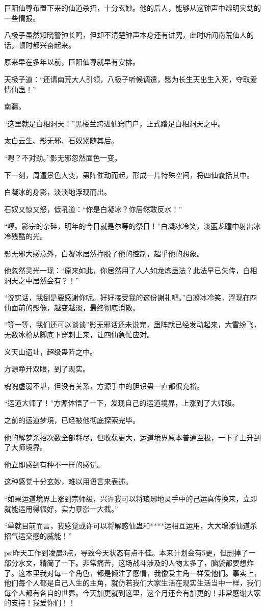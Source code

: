 \begin{this_body}
巨阳仙尊布置下来的仙道杀招，十分玄妙。他的后人，能够从这钟声中辨明灾劫的一些情报。

八极子虽然知晓警钟长鸣，但却不清楚钟声本身还有讲究，此时听闻南荒仙人的话，顿时都兴奋起来。

原来早在多年以前，巨阳仙尊就早有安排。

天极子道：“还请南荒大人引领，八极子听候调遣，愿为长生天出生入死，夺取爱情仙蛊！”

南疆。

“这里就是白相洞天！”黑楼兰跨进仙窍门户，正式踏足白相洞天之中。

太白云生、影无邪、石奴紧随其后。

“嗯？不对劲。”影无邪忽然面色一变。

下一刻，周遭景色大变，蛊阵催动而起，形成一片特殊空间，将四仙囊括其中。

白凝冰的身影，淡淡地浮现而出。

石奴又惊又怒，低吼道：“你是白凝冰？你居然敢反水！”

“哼。影宗的杂碎，明年的今日就是尔等的祭日！”白凝冰冷笑，淡蓝龙瞳中射出冰冷残酷的光。

影无邪大感意外，白凝冰居然挣脱了他的控制，超乎他的想象。

他忽然灵光一现：“原来如此，你居然用了人人如龙炼蛊法？此法早已失传，白相洞天之中居然会有？！”

“说实话，我倒是要感谢你呢。好好接受我的这份谢礼吧。”白凝冰冷笑，浮现在四仙面前的影像，越变越淡，最终彻底消散。

“等一等，我们还可以谈谈”影无邪话还未说完，蛊阵就已经发动起来，大雪纷飞，无数冰枪从脚底下穿刺上来，让四仙急忙应对。

义天山遗址，超级蛊阵之中。

方源睁开双眼，到了现实。

魂魄虚弱不堪，但没有关系，方源手中的胆识蛊一直都很充裕。

“运道大师了！”方源体悟了一下，发现自己的运道境界，上涨到了大师级。

之前的运道梦境，已经被他彻底探索完毕。

他的解梦杀招次数全部耗尽，但收获更大，运道境界原本普通至极，一下子上升到了大师境界。

他立即感到有种不一样的感觉。

这种感觉十分玄妙，难以用语言来表述。

“如果运道境界上涨到宗师级，兴许我可以将琅琊地灵手中的己运真传换来，立即就能运用得很好，实力暴涨一大截。”

“单就目前而言，我感觉或许可以将解惑仙蛊和****运相互运用，大大增添仙道杀招气运交感的威能！”

ps:昨天工作到凌晨3点，导致今天状态有点不佳。本来计划会有5更，但删掉了一部分水文，精简了一下。非常痛苦，这场战斗涉及的人物太多了，脑袋都要想炸了。这本里我对每一个角色，都是倾注了感情，我像爱主角一样爱他们。事实上，他们每个人都是自己人生的主角，就仿若我们大家生活在现实生活当中一样，我们每个人都有各自的世界。今天加更就到这里，这个月还会有加更的！非常感谢大家的支持！我爱你们！！

\end{this_body}

